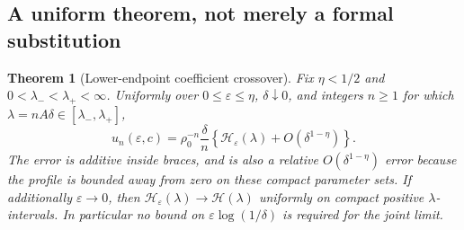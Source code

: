 \documentclass[11pt,a4paper]{article}
\numberwithin{equation}{section}
\newtheorem{theorem}{Theorem}[section]
\theoremstyle{definition}
\theoremstyle{remark}
\newcommand{\ep}{\varepsilon}\newcommand{\la}{\lambda}
\newcommand{\rhob}{\rho_0}\newcommand{\ee}{\mathrm e}
\newcommand{\HH}{\mathcal H}\newcommand{\RR}{\mathcal R}
\begin{document}
\subsection{A uniform theorem, not merely a formal substitution}
\begin{theorem}[Lower-endpoint coefficient crossover]\label{thm:crossover}
Fix \(\eta<1/2\) and \(0<\la_-<\la_+<\infty\). Uniformly over
\(0\le\ep\le\eta\), \(\delta\downarrow0\), and integers \(n\ge1\) for
which \(\la=nA\delta\in[\la_-,\la_+]\),
\begin{equation}\label{eq:crossover}
 u_n(\ep,c)=\rhob^{-n}\frac\delta n
 \left\{\HH_\ep(\la)+O(\delta^{1-\eta})\right\}.
\end{equation}
The error is additive inside braces, and is also a relative
\(O(\delta^{1-\eta})\) error because the profile is bounded away from
zero on these compact parameter sets. If additionally \(\ep\to0\), then
\(\HH_\ep(\la)\to\HH(\la)\) uniformly on compact positive
\(\la\)-intervals. In particular no bound on
\(\ep\log(1/\delta)\) is required for the joint limit.
\end{theorem}
\end{document}
